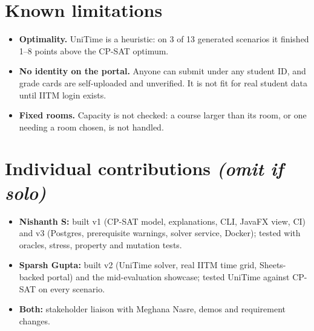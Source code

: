 \documentclass[11pt,a4paper]{article}
\begin{document}
\section{Known limitations}

\begin{itemize}[leftmargin=*,nosep]
  \item \textbf{Optimality.} UniTime is a heuristic: on 3 of 13 generated scenarios it finished 1--8 points above the CP-SAT optimum.
  \item \textbf{No identity on the portal.} Anyone can submit under any student ID, and grade cards are self-uploaded and unverified. It is not fit for real student data until IITM login exists.
  \item \textbf{Fixed rooms.} Capacity is not checked: a course larger than its room, or one needing a room chosen, is not handled.
\end{itemize}

\section{Individual contributions \textit{(omit if solo)}}

\begin{itemize}[leftmargin=*,nosep]
  \item \textbf{Nishanth S:} built v1 (CP-SAT model, explanations, CLI, JavaFX view, CI) and v3 (Postgres, prerequisite warnings, solver service, Docker); tested with oracles, stress, property and mutation tests.
  \item \textbf{Sparsh Gupta:} built v2 (UniTime solver, real IITM time grid, Sheets-backed portal) and the mid-evaluation showcase; tested UniTime against CP-SAT on every scenario.
  \item \textbf{Both:} stakeholder liaison with Meghana Nasre, demos and requirement changes.
\end{itemize}
\end{document}
